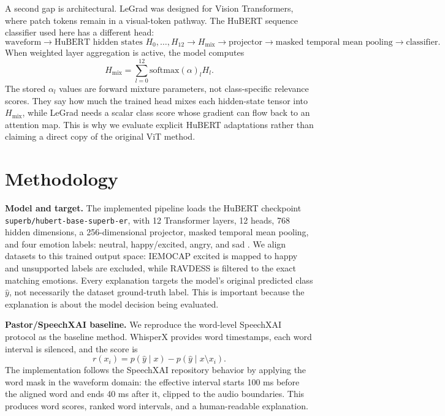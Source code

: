 \documentclass[10pt]{article}
\begin{document}
A second gap is architectural. LeGrad was designed for Vision Transformers, where patch tokens remain in a visual-token pathway. The HuBERT sequence classifier used here has a different head:
\[
\text{waveform} \rightarrow \text{HuBERT hidden states } H_0,\ldots,H_{12}
\rightarrow H_{\mathrm{mix}} \rightarrow \text{projector}
\rightarrow \text{masked temporal mean pooling}
\rightarrow \text{classifier}.
\]
When weighted layer aggregation is active, the model computes
\[
H_{\mathrm{mix}}=\sum_{l=0}^{12}\mathrm{softmax}(\alpha)_l H_l.
\]
The stored \(\alpha_l\) values are forward mixture parameters, not class-specific relevance scores. They say how much the trained head mixes each hidden-state tensor into \(H_{\mathrm{mix}}\), while LeGrad needs a scalar class score whose gradient can flow back to an attention map. This is why we evaluate explicit HuBERT adaptations rather than claiming a direct copy of the original ViT method.

\section{Methodology}

\textbf{Model and target.} The implemented pipeline loads the HuBERT checkpoint \texttt{superb/\allowbreak hubert-base-superb-er}, with 12 Transformer layers, 12 heads, 768 hidden dimensions, a 256-dimensional projector, masked temporal mean pooling, and four emotion labels: neutral, happy/excited, angry, and sad \cite{hsu2021hubert,yang2021superb,hfhubertsuperber}. We align datasets to this trained output space: IEMOCAP excited is mapped to happy and unsupported labels are excluded, while RAVDESS is filtered to the exact matching emotions. Every explanation targets the model's original predicted class \(\hat{y}\), not necessarily the dataset ground-truth label. This is important because the explanation is about the model decision being evaluated.

\textbf{Pastor/SpeechXAI baseline.} We reproduce the word-level SpeechXAI protocol as the baseline method. WhisperX provides word timestamps, each word interval is silenced, and the score is
\[
r(x_i)=p(\hat{y}\mid x)-p(\hat{y}\mid x\setminus x_i).
\]
The implementation follows the SpeechXAI repository behavior by applying the word mask in the waveform domain: the effective interval starts 100 ms before the aligned word and ends 40 ms after it, clipped to the audio boundaries. This produces word scores, ranked word intervals, and a human-readable explanation.
\end{document}
